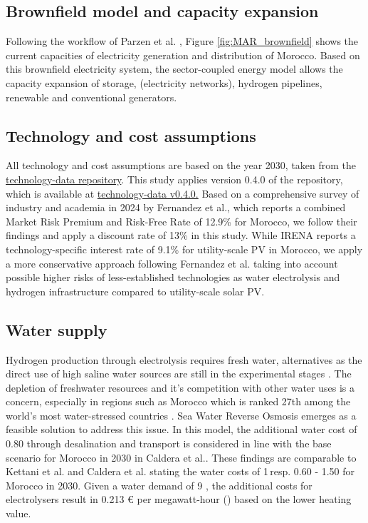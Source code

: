 \subsection*{Brownfield model and capacity expansion}
\label{brownfield_model}
Following the workflow of Parzen et al. \cite{Parzen2023}, Figure \ref{fig:MAR_brownfield} shows the current capacities of electricity generation and distribution of Morocco. Based on this brownfield electricity system, the sector-coupled energy model allows the capacity expansion of storage, (electricity networks), hydrogen pipelines, renewable and conventional generators.

\subsection*{Technology and cost assumptions}
\label{subsec:tech_assump}
All technology and cost assumptions are based on the year 2030, taken from the \href{https://github.com/pypsa/technology-data}{technology-data repository}. This study applies version 0.4.0 of the repository, which is available at \href{https://github.com/PyPSA/technology-data/blob/v0.4.0/outputs/costs_2030.csv}{technology-data v0.4.0.}
Based on a comprehensive survey of industry and academia in 2024 by Fernandez et al.\cite{Fernandez2024}, which reports a combined Market Risk Premium and Risk-Free Rate of 12.9\% for Morocco, we follow their findings and apply a discount rate of 13\% in this study. While IRENA\cite{IRENA2023} reports a technology-specific interest rate of 9.1\% for utility-scale PV in Morocco, we apply a more conservative approach following Fernandez et al.\cite{Fernandez2024} taking into account possible higher risks of less-established technologies as water electrolysis and hydrogen infrastructure compared to utility-scale solar PV.



\subsection*{Water supply}
\label{subsec:water_supply}
Hydrogen production through electrolysis requires fresh water, alternatives as the direct use of high saline water sources are still in the experimental stages \cite{Tong2020}. The depletion of freshwater resources and it's competition with other water uses is a concern, especially in regions such as Morocco which is ranked 27th among the world's most water-stressed countries \cite{Maddocks2015}. 
Sea Water Reverse Osmosis emerges as a feasible solution to address this issue. In this model, the additional water cost of 0.80 \eurcubicm through desalination and transport is considered in line with the base scenario for Morocco in 2030 in Caldera et al.\cite{Caldera2020}. These findings are comparable to Kettani et al.\cite{Kettani2020} and Caldera et al.\cite{Caldera2016} stating the water costs of 1\,\usdcubicm resp. 0.60 - 1.50 \eurcubicm for Morocco in 2030. Given a water demand of 9 \lkgHtwo \cite{Hampp2023}, the additional costs for electrolysers result in 0.213 € per megawatt-hour (\eurMWh) based on the lower heating value.

